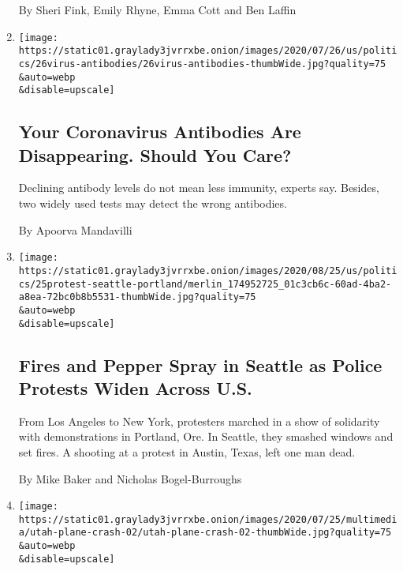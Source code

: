 \begin{enumerate}
  By Sheri Fink, Emily Rhyne, Emma Cott and Ben Laffin
\item
  \href{/2020/07/26/health/coronvirus-antibody-tests.html}{}

  \texttt{[image: https://static01.graylady3jvrrxbe.onion/images/2020/07/26/us/politics/26virus-antibodies/26virus-antibodies-thumbWide.jpg?quality=75\\\&auto=webp\\\&disable=upscale]}

  \hypertarget{your-coronavirus-antibodies-are-disappearing-should-you-care}{%
  \subsection{Your Coronavirus Antibodies Are Disappearing. Should You
  Care?}\label{your-coronavirus-antibodies-are-disappearing-should-you-care}}

  Declining antibody levels do not mean less immunity, experts say.
  Besides, two widely used tests may detect the wrong antibodies.

  By Apoorva Mandavilli
\item
  \href{/2020/07/25/us/protests-seattle-portland.html}{}

  \texttt{[image: https://static01.graylady3jvrrxbe.onion/images/2020/08/25/us/politics/25protest-seattle-portland/merlin\_174952725\_01c3cb6c-60ad-4ba2-a8ea-72bc0b8b5531-thumbWide.jpg?quality=75\\\&auto=webp\\\&disable=upscale]}

  \hypertarget{fires-and-pepper-spray-in-seattle-as-police-protests-widen-across-us-1}{%
  \subsection{Fires and Pepper Spray in Seattle as Police Protests Widen
  Across
  U.S.}\label{fires-and-pepper-spray-in-seattle-as-police-protests-widen-across-us-1}}

  From Los Angeles to New York, protesters marched in a show of
  solidarity with demonstrations in Portland, Ore. In Seattle, they
  smashed windows and set fires. A shooting at a protest in Austin,
  Texas, left one man dead.

  By Mike Baker and Nicholas Bogel-Burroughs
\item
  \href{/2020/07/25/us/plane-crash-west-jordan-utah.html}{}

  \texttt{[image: https://static01.graylady3jvrrxbe.onion/images/2020/07/25/multimedia/utah-plane-crash-02/utah-plane-crash-02-thumbWide.jpg?quality=75\\\&auto=webp\\\&disable=upscale]}


\end{enumerate}

